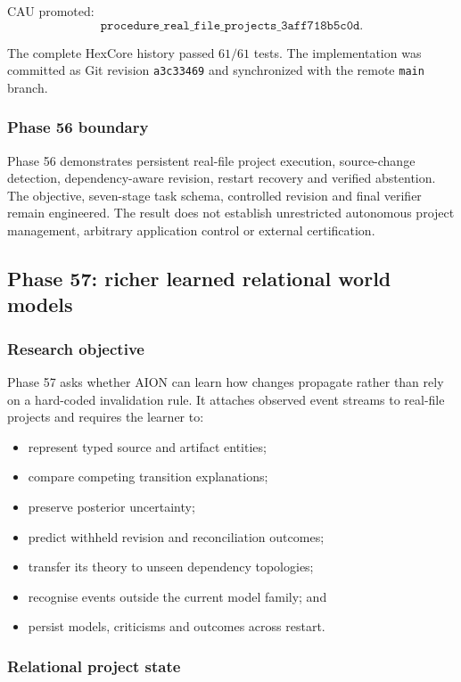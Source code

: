 CAU promoted:
\[
\texttt{procedure\_real\_file\_projects\_3aff718b5c0d}.
\]

The complete HexCore history passed \(61/61\) tests.  The implementation was
committed as Git revision \texttt{a3c33469} and synchronized with the remote
\texttt{main} branch.

\subsubsection{Phase 56 boundary}

Phase 56 demonstrates persistent real-file project execution, source-change
detection, dependency-aware revision, restart recovery and verified
abstention.  The objective, seven-stage task schema, controlled revision and
final verifier remain engineered.  The result does not establish unrestricted
autonomous project management, arbitrary application control or external
certification.

\subsection{Phase 57: richer learned relational world models}
\label{subsec:phase57-world-models}

\subsubsection{Research objective}

Phase 57 asks whether AION can learn how changes propagate rather than rely
on a hard-coded invalidation rule.  It attaches observed event streams to
real-file projects and requires the learner to:
\begin{itemize}
    \item represent typed source and artifact entities;
    \item compare competing transition explanations;
    \item preserve posterior uncertainty;
    \item predict withheld revision and reconciliation outcomes;
    \item transfer its theory to unseen dependency topologies;
    \item recognise events outside the current model family; and
    \item persist models, criticisms and outcomes across restart.
\end{itemize}

\subsubsection{Relational project state}

